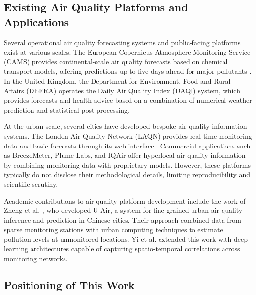 \subsection{Existing Air Quality Platforms and Applications}
\label{subsec:existing_platforms}

Several operational air quality forecasting systems and public-facing platforms exist at various scales. The European Copernicus Atmosphere Monitoring Service (CAMS) provides continental-scale air quality forecasts based on chemical transport models, offering predictions up to five days ahead for major pollutants \cite{marecal2015regional}. In the United Kingdom, the Department for Environment, Food and Rural Affairs (DEFRA) operates the Daily Air Quality Index (DAQI) system, which provides forecasts and health advice based on a combination of numerical weather prediction and statistical post-processing.

At the urban scale, several cities have developed bespoke air quality information systems. The London Air Quality Network (LAQN) provides real-time monitoring data and basic forecasts through its web interface \cite{laqn2024}. Commercial applications such as BreezoMeter, Plume Labs, and IQAir offer hyperlocal air quality information by combining monitoring data with proprietary models. However, these platforms typically do not disclose their methodological details, limiting reproducibility and scientific scrutiny.

Academic contributions to air quality platform development include the work of Zheng et al. \cite{zheng2015forecasting}, who developed U-Air, a system for fine-grained urban air quality inference and prediction in Chinese cities. Their approach combined data from sparse monitoring stations with urban computing techniques to estimate pollution levels at unmonitored locations. Yi et al. \cite{yi2018deep} extended this work with deep learning architectures capable of capturing spatio-temporal correlations across monitoring networks.

\subsection{Positioning of This Work}
\label{subsec:positioning}

